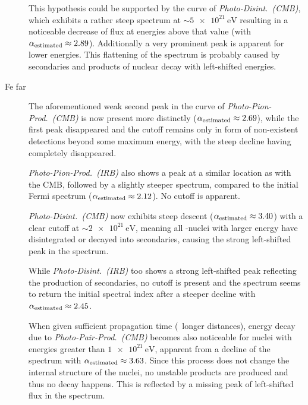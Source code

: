 \begin{description}
        This hypothesis could be supported by the curve of
        \emph{Photo-Disint.~(CMB)}, which exhibits a rather steep spectrum
        at $\sim\SI{5e21}{\electronvolt}$ resulting in a noticeable decrease
        of flux at energies above that value (with
        $\alpha_{\mathrm{estimated}}\approx2.89$). Additionally a very prominent peak is
        apparent for lower energies. This flattening of the spectrum
        is probably caused by secondaries and products of nuclear
        decay with left-shifted energies.

    \item[Fe far]
        The aforementioned weak second peak in the curve of
        \emph{Photo-Pion-Prod.~(CMB)} is now present more distinctly
        ($\alpha_{\mathrm{estimated}}\approx2.69$), while the first peak disappeared and the
        cutoff remains only in form of non-existent detections beyond some
        maximum energy, with the steep decline having completely disappeared.

        \emph{Photo-Pion-Prod.~(IRB)} also shows a peak at a similar
        location as with the CMB, followed by a slightly steeper spectrum,
        compared to the initial Fermi spectrum ($\alpha_{\mathrm{estimated}}\approx2.12$).
        No cutoff is apparent.

        \emph{Photo-Disint.~(CMB)} now exhibits steep descent
        ($\alpha_{\mathrm{estimated}}\approx3.40$) with a clear cutoff at
        $\sim\SI{2e21}{\electronvolt}$, meaning all \Fe-nuclei with larger
        energy have disintegrated or decayed into secondaries, causing the
        strong left-shifted peak in the spectrum.

        While \emph{Photo-Disint.~(IRB)} too shows a strong left-shifted
        peak reflecting the production of secondaries, no cutoff is present
        and the spectrum seems to return the initial spectral index after a
        steeper decline with $\alpha_{\mathrm{estimated}}\approx2.45$.

        When given sufficient propagation time (\ie~longer distances),
        energy decay due to \emph{Photo-Pair-Prod.~(CMB)} becomes also
        noticeable for nuclei with energies greater than
        $\SI{1e21}{\electronvolt}$, apparent from a decline of the spectrum
        with $\alpha_{\mathrm{estimated}}\approx3.63$. Since this process does not change
        the internal structure of the nuclei, no unstable products are produced
        and thus no decay happens. This is reflected by a missing peak of
        left-shifted flux in the spectrum.

\end{description}

